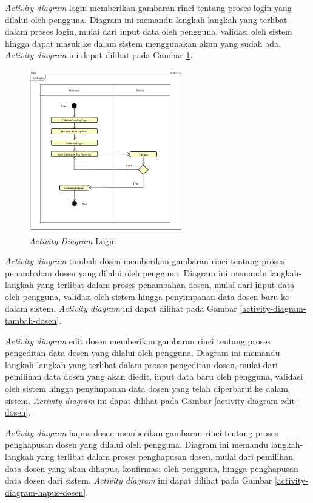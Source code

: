 \textit{Activity diagram} login memberikan gambaran rinci tentang proses login yang dilalui oleh pengguna. Diagram ini memandu langkah-langkah yang terlibat dalam proses login, mulai dari input data oleh pengguna, validasi oleh sistem hingga dapat masuk ke dalam sistem menggunakan akun yang sudah ada. \textit{Activity diagram} ini dapat dilihat pada Gambar \ref{activity-diagram-login}.
\begin{figure}
	\centering
	\includegraphics[width=0.6\textwidth]{konten/gambar/activity-diagram/login.png}
	\caption{\textit{Activity Diagram} Login}
	\label{activity-diagram-login}
\end{figure}

\textit{Activity diagram} tambah dosen memberikan gambaran rinci tentang proses penambahan dosen yang dilalui oleh pengguna. Diagram ini memandu langkah-langkah yang terlibat dalam proses penambahan dosen, mulai dari input data oleh pengguna, validasi oleh sistem hingga penyimpanan data dosen baru ke dalam sistem. \textit{Activity diagram} ini dapat dilihat pada Gambar \ref{activity-diagram-tambah-dosen}.



\textit{Activity diagram} edit dosen memberikan gambaran rinci tentang proses pengeditan data dosen yang dilalui oleh pengguna. Diagram ini memandu langkah-langkah yang terlibat dalam proses pengeditan dosen, mulai dari pemilihan data dosen yang akan diedit, input data baru oleh pengguna, validasi oleh sistem hingga penyimpanan data dosen yang telah diperbarui ke dalam sistem. \textit{Activity diagram} ini dapat dilihat pada Gambar \ref{activity-diagram-edit-dosen}.



\textit{Activity diagram} hapus dosen memberikan gambaran rinci tentang proses penghapusan dosen yang dilalui oleh pengguna. Diagram ini memandu langkah-langkah yang terlibat dalam proses penghapusan dosen, mulai dari pemilihan data dosen yang akan dihapus, konfirmasi oleh pengguna, hingga penghapusan data dosen dari sistem. \textit{Activity diagram} ini dapat dilihat pada Gambar \ref{activity-diagram-hapus-dosen}.


